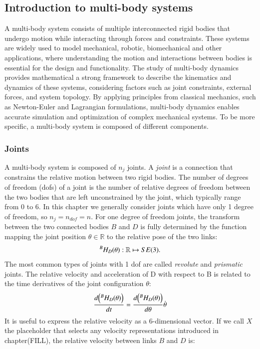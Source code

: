 \subsection{Introduction to multi-body systems}
A multi-body system consists of multiple interconnected rigid bodies that undergo motion while interacting through forces and constraints. These systems are widely used to model mechanical, robotic, biomechanical and other applications, where understanding the motion and interactions between bodies is essential for the design and functionality. The study of multi-body dynamics provides mathematical a strong framework to describe the kinematics and dynamics of these systems, considering factors such as joint constraints, external forces, and system topology. By applying principles from classical mechanics, such as Newton-Euler and Lagrangian formulations, multi-body dynamics enables accurate simulation and optimization of complex mechanical systems.
To be more specific, a multi-body system is composed of different components.


\subsubsection{Joints}\label{sssec_joints}
A multi-body system is composed of $n_j$ joints. A \textit{joint} is a connection that constrains the relative motion between two rigid bodies. The number of degrees of freedom (dofs) of a joint is the number of relative degrees of freedom between the two bodies that are left unconstrained by the joint, which typically range from 0 to 6. In this chapter we generally consider joints which have only 1 degree of freedom, so $n_j = n_{dof} = n$.
For one degree of freedom joints, the transform between the two connected bodies $B$ and $D$ is fully determined by the function mapping the joint position $\theta \in \mathbb{R}$ to the relative pose of the two links:
\[
{}^{B}{H}_{D}(\theta) :\mathbb{R} \mapsto SE(3).
\]
The most common types of joints with 1 dof are called \textit{revolute} and \textit{prismatic} joints.
The relative velocity and acceleration of D with respect to B is related to the time derivatives of the joint configuration $\theta$:
\begin{equation}
 \frac{d \Big({}^{B}{H}_{D}(\theta) \Big)}{dt} = \frac{d \Big({}^{B}{H}_{D}(\theta) \Big)}{d \theta}\dot{\theta}
\end{equation}
It is useful to express the relative velocity as a 6-dimensional vector. If we call $X$ the placeholder that selects any velocity representations introduced in chapter(FILL), the relative velocity between links $B$ and $D$ is:

